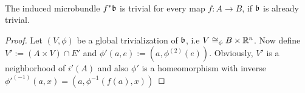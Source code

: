 \\ The induced microbundle $f^*\mathfrak{b}$ is trivial for every map $f: A \to B$, if $\mathfrak{b}$ is already trivial.
\begin{proof}
Let $(V, \phi)$ be a global trivialization of $\mathfrak{b}$, i.e $V \cong_\phi B \times \mathbb{R}^n$. Now define $V' := (A \times V) \cap E'$ and $\phi'(a, e) := (a, \phi^{(2)}(e))$. Obviously, $V'$ is a neighborhood of $i'(A)$ and also $\phi'$ is a homeomorphism with inverse $\phi'^{(-1)}(a, x) = (a, \phi^{-1}(f(a), x))$
\end{proof}